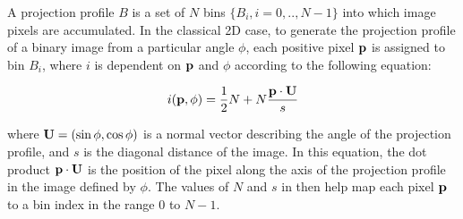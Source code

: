 
A projection profile $B$ is a set of $N$ bins $\{B_i, i=0,..,N-1\}$ into which image
pixels are accumulated.  In the classical 2D case, to generate the projection
profile of a binary image from a particular angle $\phi$, each positive pixel
${ \bf p }$ is assigned to bin $B_i$, where $i$ is dependent on ${ \bf p }$ and
$\phi$ according to the following equation:

\begin{equation} \label{classicproj} 
i({ \bf p },\phi) = \frac{1}{2} N + N
\frac{ { \bf p } \cdot { \bf U } }{ s } 
\end{equation}

{ \parindent 0mm where ${ \bf U }=(\sin \phi,\cos \phi)$ is a normal vector
describing the angle of the projection profile, and $s$ is the diagonal
distance of the image.  In this equation, the dot product ${ \bf p } \cdot
{ \bf U }$ is the position of the pixel along the axis of the projection profile
in the image defined by $\phi$. The values of $N$ and $s$ in
 then help map each pixel ${ \bf p }$ to a bin index in the range $0$ to $N-1$.
}



